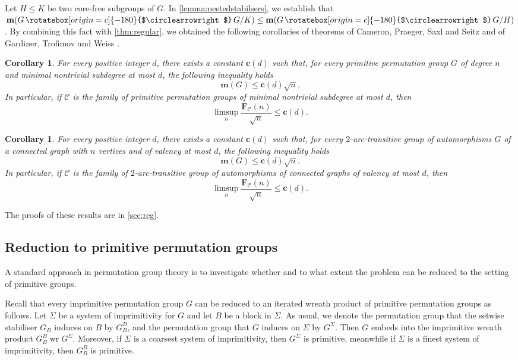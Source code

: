\documentclass[a4paper]{amsart}
\renewcommand{\wr}{\mathop{\mathrm{wr}}}
\newcommand{\F}{\mathbf{F}}
\newcommand{\m}{\mathbf{m}}
\newcommand{\C}{\mathcal{C}}
\newcommand{\act}{\,\rotatebox[origin=c]{-180}{$\circlearrowright$}\,}
\newtheorem{corx}[thmx]{Corollary}
\theoremstyle{definition}
\begin{document}
Let $H\le K$ be two core-free subgroups of $G$. In \cref{lemma:nestedstabilsers}, we establish that $\m(G\act G/K) \le \m(G \act G/H)$. By combining this fact with \cref{thm:regular}, we obtained the following corollaries of theorems of Cameron, Praeger, Saxl and Seitz \cite{CameronPraegerSaxlSeitz1983} and of Gardiner, Trofimov and Weiss \cite{Gardiner1976, Trofimov1990, Trofimov1991, Weiss1979, Weiss1993}.
\begin{corx}\label{cor:subdegree}
    For every positive integer $d$, there exists a constant $\mathbf{c}(d)$ such that, for every primitive permutation group $G$ of degree $n$ and minimal nontrivial subdegree at most $d$, the following inequality holds
    \[ \m(G) \le \mathbf{c}(d)\sqrt{n} .\]
    In particular, if $\C$ is the family of primitive permutation groups of minimal nontrivial subdegree at most $d$, then
    \[ \limsup_n \frac{\F_\C(n)}{\sqrt n} \le \mathbf{c}(d) .\]
\end{corx}
\begin{corx}\label{cor:graphRestrictive}
    For every positive integer $d$, there exists a constant $\mathbf{c}(d)$ such that, for every $2$-arc-transitive group of automorphisms $G$ of a connected graph with $n$ vertices and of valency at most $d$, the following inequality holds
    \[ \m(G) \le \mathbf{c}(d)\sqrt{n} .\]
    In particular, if $\C$ is the family of $2$-arc-transitive group of automorphisms of connected graphs of valency at most $d$, then
    \[ \limsup_n \frac{\F_\C(n)}{\sqrt n} \le \mathbf{c}(d) .\]
\end{corx}
The proofs of these results are in \cref{sec:reg}.
\subsection{Reduction to primitive permutation groups} A standard approach in permutation group theory is to investigate whether and to what extent the problem can be reduced to the setting of primitive groups.

Recall that every imprimitive permutation group $G$ can be reduced to an iterated wreath product of primitive permutation groups as follows. Let $\Sigma$ be a system of imprimitivity for $G$ and let $B$ be a block in $\Sigma$. As usual, we denote the permutation group that the setwise stabiliser $G_B$ induces on $B$ by $G_B^B$, and  the permutation group that $G$ induces on $\Sigma$ by $G^\Sigma$. Then $G$ embeds into the imprimitive wreath product $G_B^B \wr G^\Sigma$. Moreover, if $\Sigma$ is a coarsest system of imprimitivity, then $G^\Sigma$ is primitive, meanwhile if $\Sigma$ is a finest system of imprimitivity, then $G_B^B$ is primitive.
\end{document}

